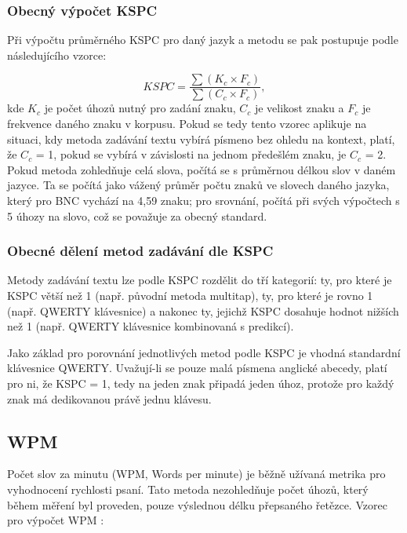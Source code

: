 \documentclass[a4paper,11pt]{article}
\begin{document}
\subsubsection{Obecný výpočet KSPC}

Při výpočtu průměrného KSPC pro daný jazyk a metodu se pak postupuje podle následujícího vzorce:

\[
	KSPC = \frac{\sum{ (K_c \times F_c) }}{\sum{ (C_c \times F_c) }},
\]
kde $K_c$ je počet úhozů nutný pro zadání znaku, $C_c$ je velikost znaku a $F_c$ je frekvence daného znaku v korpusu. Pokud se tedy tento vzorec aplikuje na situaci, kdy metoda zadávání textu vybírá písmeno bez ohledu na kontext, platí, že $C_c$ = 1, pokud se vybírá v závislosti na jednom předešlém znaku, je $C_c$ = 2. Pokud metoda zohledňuje celá slova, počítá se s průměrnou délkou slov v daném jazyce. Ta se počítá jako vážený průměr počtu znaků ve slovech daného jazyka, který pro BNC vychází na 4,59 znaku; pro srovnání, \parencite[2]{arif2009analysis} počítá při svých výpočtech s 5 úhozy na slovo, což se považuje za obecný standard. \parencite[3]{tarvainen2010beginner} %

\subsubsection{Obecné dělení metod zadávání dle KSPC}

Metody zadávání textu lze podle KSPC rozdělit do tří kategorií: ty, pro které je KSPC větší než 1 (např. původní metoda multitap), ty, pro které je rovno 1 (např. QWERTY klávesnice) a nakonec ty, jejichž KSPC dosahuje hodnot nižších než 1 (např. QWERTY klávesnice kombinovaná s predikcí). %

Jako základ pro porovnání jednotlivých metod podle KSPC je vhodná standardní klávesnice QWERTY. \parencite{arif2009analysis} %
Uvažují-li se pouze malá písmena anglické abecedy, platí pro ni, že KSPC = 1, tedy na jeden znak připadá jeden úhoz, protože pro každý znak má dedikovanou právě jednu klávesu.

\subsection{WPM}

Počet slov za minutu (WPM, Words per minute) je běžně užívaná metrika pro vyhodnocení rychlosti psaní. \parencite{tarvainen2010beginner} %
Tato metoda nezohledňuje počet úhozů, který během měření byl proveden, pouze výslednou délku přepsaného řetězce. Vzorec pro výpočet WPM \parencite[48]{wobbrockjacobo.2007}:
\end{document}

